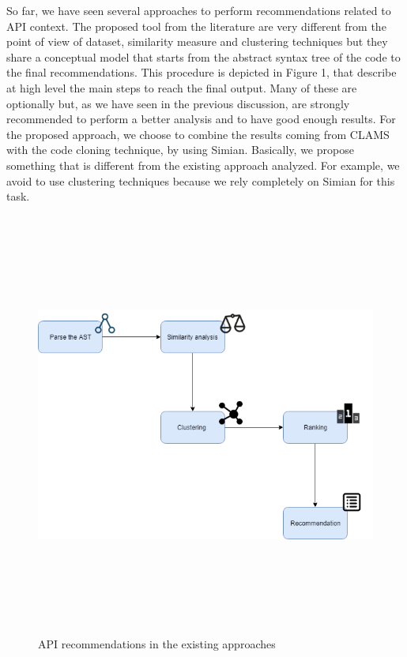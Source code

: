 So far, we have seen several approaches to perform recommendations related to API context. The proposed tool from the literature are very different from the point of view of dataset, similarity measure and clustering techniques but they share a conceptual model that starts from the abstract syntax tree of the code to the final recommendations. This procedure is depicted in Figure 1, that describe at high level the main steps to reach the final output. Many of these are optionally but, as we have seen in the previous discussion, are strongly recommended to perform a better analysis and to have good enough results.
For the proposed approach, we choose to combine the results coming from CLAMS with the code cloning technique, by using Simian. Basically, we propose something that is different from the existing approach analyzed. For example, we avoid to use clustering techniques because we rely completely on Simian for this task.  

\begin{figure}[H]
\includegraphics[width=12cm,height=14cm,keepaspectratio]{images/approach.png}
\centering
\caption{API recommendations in the existing approaches}
\label{fig:cmd}
\end{figure}


